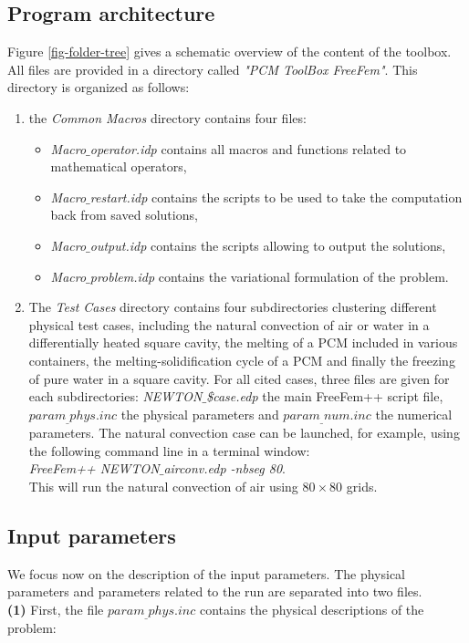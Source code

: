 \subsection{Program architecture}
Figure \ref{fig-folder-tree} gives a schematic overview of the content of the toolbox. All files are provided in a directory called {\it "PCM ToolBox FreeFem"}. 
This directory is organized as follows:
\begin{enumerate}
   \item the {\em Common Macros} directory contains four files:
   \begin{itemize}
      \item {\em Macro$\_$operator.idp} contains all macros and functions related to mathematical operators,
      \item {\em Macro$\_$restart.idp} contains the scripts to be used to take the computation back from saved solutions,
      \item {\em Macro$\_$output.idp} contains the scripts allowing to output the solutions,
      \item {\em Macro$\_$problem.idp} contains the variational formulation of the problem. 
   \end{itemize}
   \item The {\em Test Cases} directory contains four subdirectories clustering different physical test cases, including the natural convection of air or water in a differentially heated square cavity, the melting of a PCM included in various containers, the melting-solidification cycle of a PCM and finally the freezing of pure water in a square cavity. 
   For all cited cases, three files are given for each subdirectories: {\em NEWTON$\_$\$case.edp} the main FreeFem++ script file, $param_\_phys.inc$ the physical parameters and $param_\_num.inc$ the numerical parameters.
   The natural convection case can be launched, for example, using the following command line in a terminal window:\\
  {\em FreeFem++ NEWTON$\_$airconv.edp -nbseg 80}.\\
  This will run the natural convection of air using $80 \times 80$ grids.
\end{enumerate}

\subsection{Input parameters}
We focus now on the description of the input parameters.
The physical parameters and parameters related to the run are separated into two files.\\
{\bf (1)} First, the file $param_\_phys.inc$ contains the physical descriptions of the problem:

